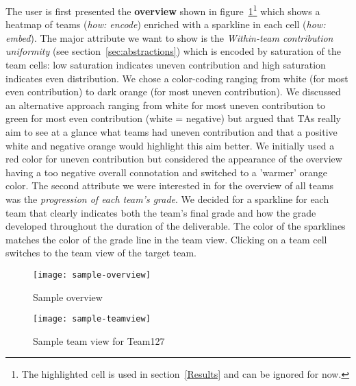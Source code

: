 \documentclass[../manifest.tex]{subfiles}
\begin{document}
The user is first presented the \textbf{overview} shown in figure~\ref{fig:sample-overview}\footnote{The highlighted cell is used in section~\ref{Results} and can be ignored for now.} which shows a heatmap of teams (\textit{how: encode}) enriched with a sparkline in each cell (\textit{how: embed}). The major attribute we want to show is the \textit{Within-team contribution uniformity} (see section~\ref{sec:abstractions}) which is encoded by saturation of the team cells: low saturation indicates uneven contribution and high saturation indicates even distribution. We chose a color-coding ranging from white (for most even contribution) to dark orange (for most uneven contribution). We discussed an alternative approach ranging from white for most uneven contribution to green for most even contribution (white = negative) but argued that TAs really aim to see at a glance what teams had uneven contribution and that a positive white and negative orange would highlight this aim better. We initially used a red color for uneven contribution but considered the appearance of the overview having a too negative overall connotation and switched to a 'warmer' orange color. The second attribute we were interested in for the overview of all teams was the \textit{progression of each team's grade}. We decided for a sparkline for each team that clearly indicates both the team's final grade and how the grade developed throughout the duration of the deliverable. The color of the sparklines matches the color of the grade line in the team view. Clicking on a team cell switches to the team view of the target team.

\begin{figure}[h]
  \centering
  \texttt{[image: sample-overview]}
  \caption{Sample overview}
  \label{fig:sample-overview}
\end{figure}

\begin{figure}[h]
  \centering
  \texttt{[image: sample-teamview]}
  \caption{Sample team view for Team127}
  \label{fig:sample-teamview}
\end{figure}
\end{document}
